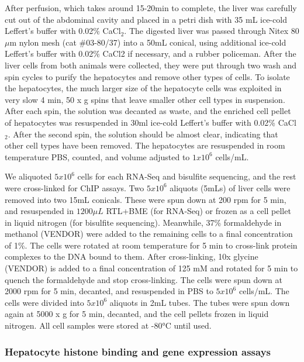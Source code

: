 \documentclass[10pt,letterpaper]{article}
\begin{document}
After perfusion, which takes around 15-20min to complete, the liver was
carefully cut out of the abdominal cavity and placed in a petri dish
with 35 mL ice-cold Leffert's buffer with 0.02\% CaCl\(_{2}\). The
digested liver was passed through Nitex 80 \(\mu\)m nylon mesh (cat
\#03-80/37) into a 50mL conical, using additional ice-cold Leffert's
buffer with 0.02\% CaCl2 if necessary, and a rubber policeman. After the
liver cells from both animals were collected, they were put through two
wash and spin cycles to purify the hepatocytes and remove other types of
cells. To isolate the hepatocytes, the much larger size of the
hepatocyte cells was exploited in very slow 4 min, 50 x g spins that
leave smaller other cell types in suspension. After each spin, the
solution was decanted as waste, and the enriched cell pellet of
hepatocytes was resuspended in 30ml ice-cold Leffert's buffer with
0.02\% CaCl\(_{2}\). After the second spin, the solution should be
almost clear, indicating that other cell types have been removed. The
hepatocytes are resuspended in room temperature PBS, counted, and volume
adjusted to \(1 x 10^{6}\) cells/mL.

We aliquoted \(5 x 10^{6}\) cells for each RNA-Seq and bisulfite
sequencing, and the rest were cross-linked for ChIP assays. Two
\(5 x 10^6\) aliquots (5mLs) of liver cells were removed into two 15mL
conicals. These were spun down at 200 rpm for 5 min, and resuspended in
\(1200\mu L\) RTL+BME (for RNA-Seq) or frozen as a cell pellet in liquid
nitrogen (for bisulfite sequencing). Meanwhile, 37\% formaldehyde in
methanol (VENDOR) were added to the remaining cells to a final
concentration of 1\%. The cells were rotated at room temperature for 5
min to cross-link protein complexes to the DNA bound to them. After
cross-linking, 10x glycine (VENDOR) is added to a final concentration of
125 mM and rotated for 5 min to quench the formaldehyde and stop
cross-linking. The cells were spun down at 2000 rpm for 5 min, decanted,
and resuspended in PBS to \(5 x 10^6\) cells/mL. The cells were divided
into \(5x10^6\) aliquots in 2mL tubes. The tubes were spun down again at
5000 x g for 5 min, decanted, and the cell pellets frozen in liquid
nitrogen. All cell samples were stored at -80°C until used.

\hypertarget{hepatocyte-histone-binding-and-gene-expression-assays}{%
\subsubsection{Hepatocyte histone binding and gene expression
assays}\label{hepatocyte-histone-binding-and-gene-expression-assays}}
\end{document}
